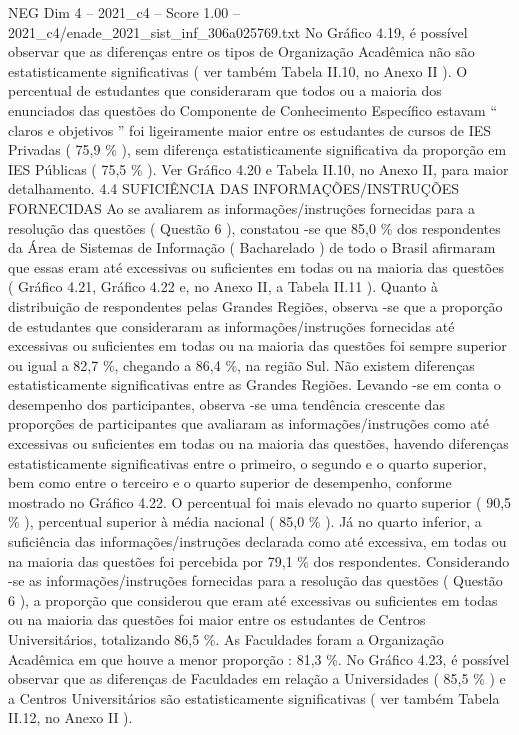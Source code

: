 \begin{textsample}{NEG Dim 4 – 2021\_c4 – Score 1.00 – 2021\_c4/enade\_2021\_sist\_inf\_306a025769.txt}
No Gráfico 4.19, é possível observar que as diferenças entre os tipos de Organização Acadêmica não são estatisticamente significativas ( ver também Tabela II.10, no Anexo II ).
O percentual de estudantes que consideraram que todos ou a maioria dos enunciados das questões do Componente de Conhecimento Específico estavam “ claros e objetivos ” foi ligeiramente maior entre os estudantes de cursos de IES Privadas ( 75,9 \% ), sem diferença estatisticamente significativa da proporção em IES Públicas ( 75,5 \% ).
Ver Gráfico 4.20 e Tabela II.10, no Anexo II, para maior detalhamento. 4.4 SUFICIÊNCIA DAS INFORMAÇÕES/INSTRUÇÕES FORNECIDAS Ao se avaliarem as informações/instruções fornecidas para a resolução das questões ( Questão 6 ), constatou -se que 85,0 \% dos respondentes da Área de Sistemas de Informação ( Bacharelado ) de todo o Brasil afirmaram que essas eram até excessivas ou suficientes em todas ou na maioria das questões ( Gráfico 4.21, Gráfico 4.22 e, no Anexo II, a Tabela II.11 ).
Quanto à distribuição de respondentes pelas Grandes Regiões, observa -se que a proporção de estudantes que consideraram as informações/instruções fornecidas até excessivas ou suficientes em todas ou na maioria das questões foi sempre superior ou igual a 82,7 \%, chegando a 86,4 \%, na região Sul.
Não existem diferenças estatisticamente significativas entre as Grandes Regiões.
Levando -se em conta o desempenho dos participantes, observa -se uma tendência crescente das proporções de participantes que avaliaram as informações/instruções como até excessivas ou suficientes em todas ou na maioria das questões, havendo diferenças estatisticamente significativas entre o primeiro, o segundo e o quarto superior, bem como entre o terceiro e o quarto superior de desempenho, conforme mostrado no Gráfico 4.22.
O percentual foi mais elevado no quarto superior ( 90,5 \% ), percentual superior à média nacional ( 85,0 \% ).
Já no quarto inferior, a suficiência das informações/instruções declarada como até excessiva, em todas ou na maioria das questões foi percebida por 79,1 \% dos respondentes.
Considerando -se as informações/instruções fornecidas para a resolução das questões ( Questão 6 ), a proporção que considerou que eram até excessivas ou suficientes em todas ou na maioria das questões foi maior entre os estudantes de Centros Universitários, totalizando 86,5 \%.
As Faculdades foram a Organização Acadêmica em que houve a menor proporção : 81,3 \%.
No Gráfico 4.23, é possível observar que as diferenças de Faculdades em relação a Universidades ( 85,5 \% ) e a Centros Universitários são estatisticamente significativas ( ver também Tabela II.12, no Anexo II ).

\end{textsample}
